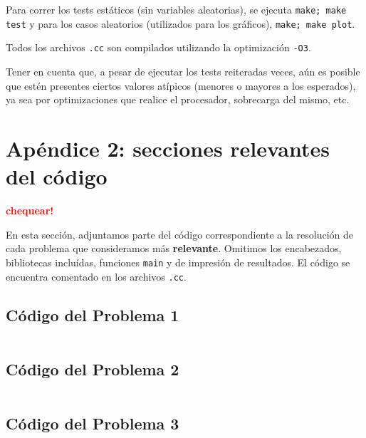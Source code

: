 \documentclass[a4paper]{article}
\begin{document}
Para correr los tests estáticos (sin variables aleatorias), se ejecuta \verb|make; make test| y para los
casos aleatorios (utilizados para los gráficos), \verb|make; make plot|.

Todos los archivos \verb|.cc| son compilados utilizando la optimización \verb|-O3|. \medskip

Tener en cuenta que, a pesar de ejecutar los tests reiteradas veces, aún es posible que estén presentes ciertos
valores atípicos (menores o mayores a los esperados), ya sea por optimizaciones que realice el procesador, sobrecarga
del mismo, etc.
\newpage

\section{Apéndice 2: secciones relevantes del código}

\textcolor{red}{\textbf{chequear!}} \medskip

En esta sección, adjuntamos parte del código correspondiente a la resolución de cada problema
que consideramos más \textbf{relevante}. Omitimos los encabezados, bibliotecas incluídas,
funciones \verb|main| y de impresión de resultados. El código se encuentra comentado en los
archivos \verb|.cc|.

\subsection{Código del Problema 1}


\begin{lstlisting}
\end{lstlisting}

\vspace*{0.5cm}


\newpage


\subsection{Código del Problema 2}


\begin{lstlisting}
\end{lstlisting}

\vspace*{0.5cm}


\newpage


\subsection{Código del Problema 3}


\begin{lstlisting}
\end{lstlisting}

\vspace*{0.5cm}
\end{document}
